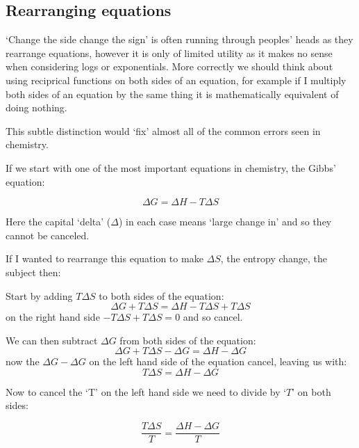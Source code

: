 \documentclass[
]{book}
\begin{document}
\hypertarget{rearranging-equations}{%
\subsection{Rearranging equations}\label{rearranging-equations}}

`Change the side change the sign' is often running through peoples' heads as they rearrange equations, however it is only of limited utility as it makes no sense when considering logs or exponentials. More correctly we should think about using reciprical functions on both sides of an equation, for example if I multiply both sides of an equation by the same thing it is mathematically equivalent of doing nothing.

This subtle distinction would `fix' almost all of the common errors seen in chemistry.

If we start with one of the most important equations in chemistry, the Gibbs' equation:

\begin{equation*}
\Delta G = \Delta H - T \Delta S
\end{equation*}

Here the capital `delta' (\(\Delta\)) in each case means `large change in' and so they cannot be canceled.

If I wanted to rearrange this equation to make \(\Delta S\), the entropy change, the subject then:

Start by adding \(T\Delta S\) to both sides of the equation:
\begin{equation*}
\Delta G + T \Delta S= \Delta H - T \Delta S + T \Delta S
\end{equation*}
on the right hand side \(- T \Delta S + T \Delta S=0\) and so cancel.

We can then subtract \(\Delta G\) from both sides of the equation:
\begin{equation*}
\Delta G + T \Delta S -\Delta G = \Delta H -\Delta G
\end{equation*}
now the \(\Delta G -\Delta G\) on the left hand side of the equation cancel, leaving us with:
\begin{equation*}
T \Delta S = \Delta H -\Delta G
\end{equation*}

Now to cancel the `T' on the left hand side we need to divide by `\(T\)' on both sides:

\begin{equation*}
\frac{T \Delta S}{T} = \frac{\Delta H -\Delta G}{T}
\end{equation*}
\end{document}
